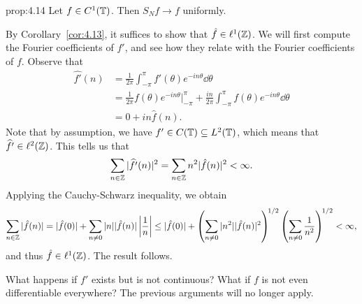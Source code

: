 \begin{prop}{prop:4.14}
    Let $f \in C^1(\mathbb{T})$. Then $S_N f \to f$ uniformly. 
\end{prop}
\begin{pf}
    By Corollary~\ref{cor:4.13}, it suffices to show that $\hat f \in 
    \ell^1(\mathbb{Z})$. We will first compute the Fourier coefficients of 
    $f'$, and see how they relate with the Fourier coefficients of $f$. 
    Observe that 
    \begin{align*}
        \widehat{f'}(n) 
        &= \frac1{2\pi} \int_{-\pi}^\pi f'(\theta) e^{-in\theta}\dd\theta \\
        &= \frac1{2\pi} f(\theta) e^{-in\theta} \bigg|_{-\pi}^\pi 
        + \frac{in}{2\pi} \int_{-\pi}^\pi f(\theta) e^{-in\theta}\dd\theta \\ 
        &= 0 + in \hat f(n).
    \end{align*}
    Note that by assumption, we have $f' \in C(\mathbb{T}) \subseteq L^2(\mathbb{T})$, which 
    means that $\widehat{f'} \in \ell^2(\mathbb{Z})$. This tells us that 
    \[ \sum_{n\in\mathbb{Z}} |\widehat{f'}(n)|^2 = \sum_{n\in\mathbb{Z}} n^2 |\hat f(n)|^2 < \infty. \] 
    Applying the Cauchy-Schwarz inequality, we obtain 
    \[ \sum_{n\in\mathbb{Z}} |\hat f(n)| 
    = |\hat f(0)| + \sum_{n\neq 0} |n| |\hat f(n)| \left| \frac1n \right| 
    \leq |\hat f(0)| + \left( \sum_{n\neq 0} |n^2| |\hat f(n)|^2 \right)^{\!1/2}
    \left( \sum_{n\neq 0} \frac{1}{n^2} \right)^{\!1/2} < \infty, \] 
    and thus $\hat f \in \ell^1(\mathbb{Z})$. The result follows. 
\end{pf}

What happens if $f'$ exists but is not continuous? What if $f$ is not even
differentiable everywhere? The previous arguments will no longer apply. 

